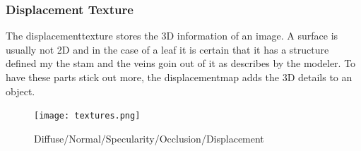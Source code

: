 \subsubsection{Displacement Texture}
The displacementtexture stores the 3D information of an image. A surface is usually not 2D and in the case of a leaf it is certain that it has a structure defined my the stam and the veins goin out of it as describes by the modeler. To have these parts stick out more, the displacementmap adds the 3D details to an object.
\begin{figure}[h]
	\centering
	\texttt{[image: textures.png]}
	\caption{Diffuse/Normal/Specularity/Occlusion/Displacement}
	\label{textures}
\end{figure}
